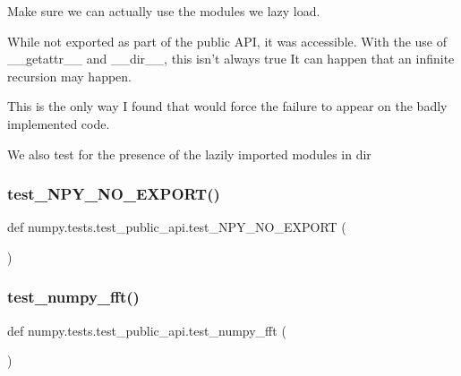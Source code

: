 \begin{DoxyVerb}Make sure we can actually use the modules we lazy load.

While not exported as part of the public API, it was accessible.  With the
use of __getattr__ and __dir__, this isn't always true It can happen that
an infinite recursion may happen.

This is the only way I found that would force the failure to appear on the
badly implemented code.

We also test for the presence of the lazily imported modules in dir\end{DoxyVerb}
 \mbox{\label{namespacenumpy_1_1tests_1_1test__public__api_a646be176fa180d60bd077859d961c899}} 
\subsubsection{\texorpdfstring{test\+\_\+\+N\+P\+Y\+\_\+\+N\+O\+\_\+\+E\+X\+P\+O\+R\+T()}{test\_NPY\_NO\_EXPORT()}}
{\footnotesize\ttfamily def numpy.\+tests.\+test\+\_\+public\+\_\+api.\+test\+\_\+\+N\+P\+Y\+\_\+\+N\+O\+\_\+\+E\+X\+P\+O\+RT (\begin{DoxyParamCaption}{ }\end{DoxyParamCaption})}

\mbox{\label{namespacenumpy_1_1tests_1_1test__public__api_a21e4469093d30b5b5d404c23e58bbcc8}} 
\subsubsection{\texorpdfstring{test\+\_\+numpy\+\_\+fft()}{test\_numpy\_fft()}}
{\footnotesize\ttfamily def numpy.\+tests.\+test\+\_\+public\+\_\+api.\+test\+\_\+numpy\+\_\+fft (\begin{DoxyParamCaption}{ }\end{DoxyParamCaption})}

